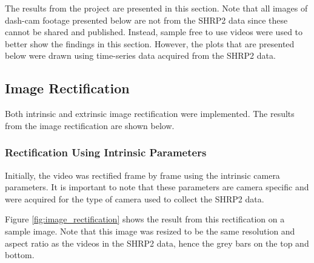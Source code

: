 The results from the project are presented in this section. Note that all images of dash-cam footage presented below are not from the SHRP2 data since these cannot be shared and published. Instead, sample free to use videos were used to better show the findings in this section. However, the plots that are presented below were drawn using time-series data acquired from the SHRP2 data. 


\subsection{Image Rectification}
Both intrinsic and extrinsic image rectification were implemented. The results from the image rectification are shown below. 


\subsubsection{Rectification Using Intrinsic Parameters}

Initially, the video was rectified frame by frame using the intrinsic camera parameters. It is important to note that these parameters are camera specific and were acquired for the type of camera used to collect the SHRP2 data.

Figure \ref{fig:image_rectification} shows the result from this rectification on a sample image. Note that this image was resized to be the same resolution and aspect ratio as the videos in the SHRP2 data, hence the grey bars on the top and bottom. 

